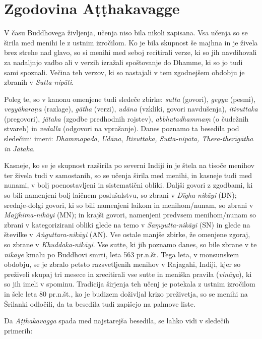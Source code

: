 \chapter{Zgodovina Aṭṭhakavagge}

V času Buddhovega življenja, učenja niso bila nikoli zapisana. Vsa učenja
so se širila med menihi le z ustnim izročilom. Ko je bila skupnost še
majhna in je živela brez strehe nad glavo, so si menihi med seboj
recitirali verze, ki so jih navdihovali za nadaljnjo vadbo ali v verzih
izražali spoštovanje do Dhamme, ki so jo tudi sami spoznali. Večina teh
verzov, ki so nastajali v tem zgodnejšem obdobju je zbranih v
\emph{Sutta-nipāti}. 

Poleg te, so v kanonu omenjene tudi sledeče zbirke:
\emph{sutta} (govori), \emph{geyya} (pesmi), \emph{veyyākaraṇa}
(razlage), \emph{gātha} (verzi), \emph{udāna} (vzkliki, govori
navdušenja), \emph{itivuttaka} (pregovori), \emph{jātaka} (zgodbe
predhodnih rojstev), \emph{abbhutadhammaṃ} (o čudežnih stvareh) in
\emph{vedalla} (odgovori na vprašanje). Danes poznamo ta besedila pod
sledečimi imeni: \emph{Dhammapada}, \emph{Udāna}, \emph{Itivuttaka,
Sutta-nipāta, Thera-therīgātha in Jātaka}. 

Kasneje, ko se je skupnost
razširila po severni Indiji in je štela na tisoče menihov ter živela
tudi v samostanih, so se učenja širila med menihi, in kasneje tudi med
nunami, v bolj poenostavljeni in sistematični obliki. Daljši govori z
zgodbami, ki so bili namenjeni bolj laičnem poslušalstvu, so zbrani v
\emph{Dīgha-nikāyi} (DN); srednje-dolgi govori, ki so bili namenjeni
laikom in menihom/nunam, so zbrani v \emph{Majjhima-nikāyi} (MN); in
krajši govori, namenjeni predvsem menihom/nunam so zbrani v
kategorizirani obliki glede na temo v \emph{Saṃyutta-nikāyi} (SN) in
glede na številke v \emph{Aṅguttara-nikāyi} (AN). Vse ostale manjše
zbirke, že omenjene zgoraj, so zbrane v \emph{Khuddaka-nikāyi}. Vse
sutte, ki jih poznamo danes, so bile zbrane v te \emph{nikāye} kmalu po
Buddhovi smrti, leta 563 pr.n.št. Tega leta, v monsunskem obdobju, se je
zbralo petsto razsvetljenih menihov v Rajagahi, Indiji, kjer so
preživeli skupaj tri mesece in zrecitirali vse sutte in meniška pravila
(\emph{vināya}), ki so jih imeli v spominu. Tradicija širjenja teh učenj
je potekala z ustnim izročilom in šele leta 80 pr.n.št., ko je budizem
doživljal krizo preživetja, so se menihi na Šrilanki odločili, da ta
besedila tudi zapišejo na palmove liste.

Da \emph{Aṭṭhakavagga} spada med najstarejša besedila, se lahko vidi v
sledečih primerih:

